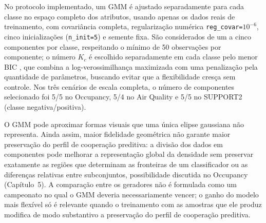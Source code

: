 No protocolo implementado, um GMM é ajustado separadamente para cada classe no espaço completo dos atributos, usando apenas os dados reais de treinamento, com covariância completa, regularização numérica \texttt{reg\_covar=$10^{-6}$}, cinco inicializações (\texttt{n\_init=5}) e semente fixa. São considerados de um a cinco componentes por classe, respeitando o mínimo de 50 observações por componente; o número $K_c$ é escolhido separadamente em cada classe pelo menor BIC \cite{mclachlan2000,schwarz1978}, que combina a log-verossimilhança maximizada com uma penalização pela quantidade de parâmetros, buscando evitar que a flexibilidade cresça sem controle. Nos três cenários de escala completa, o número de componentes selecionado foi 5/5 no Occupancy, 5/4 no Air Quality e 5/5 no SUPPORT2 (classe negativa/positiva).

O GMM pode aproximar formas visuais que uma única elipse gaussiana não representa. Ainda assim, maior fidelidade geométrica não garante maior preservação do perfil de cooperação preditiva: a divisão dos dados em componentes pode melhorar a representação global da densidade sem preservar exatamente as regiões que determinam as fronteiras de um classificador ou as diferenças relativas entre subconjuntos, possibilidade discutida no Occupancy (Capítulo~5). A comparação entre os geradores não é formulada como um campeonato no qual o GMM deveria necessariamente vencer; o ganho do modelo mais flexível só é relevante quando o treinamento com as amostras que ele produz modifica de modo substantivo a preservação do perfil de cooperação preditiva.
